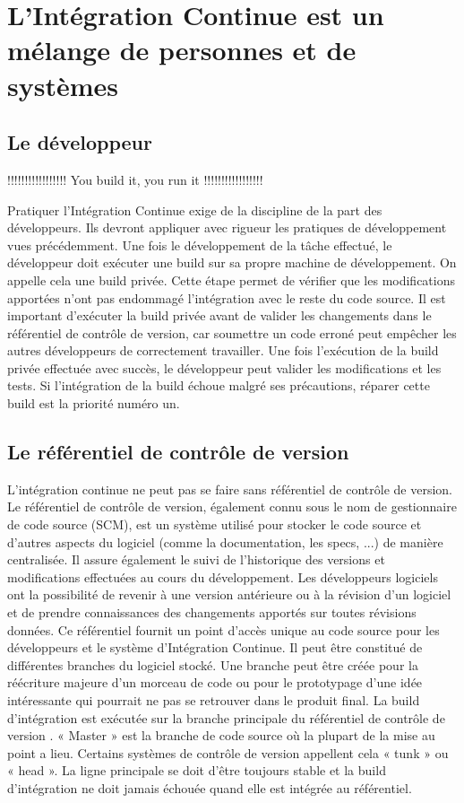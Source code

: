   \section{L’Intégration Continue est un mélange de personnes et de systèmes}

    \subsection{Le développeur}
    !!!!!!!!!!!!!!!!! You build it, you run it !!!!!!!!!!!!!!!!!

    Pratiquer l’Intégration Continue exige de la discipline de la part des développeurs. Ils devront appliquer avec rigueur les pratiques de développement vues précédemment. Une fois le développement de la tâche effectué, le développeur doit exécuter une build sur sa propre machine de développement. On appelle cela une build privée. Cette étape permet de vérifier que les modifications apportées n’ont pas endommagé l'intégration avec le reste du code source. Il est important d'exécuter la build privée avant de valider les changements dans le référentiel de contrôle de version, car soumettre un code erroné peut empêcher les autres développeurs de correctement travailler. Une fois l’exécution de la build privée effectuée avec succès, le développeur peut valider les modifications et les tests. Si l'intégration de la build échoue malgré ses précautions, réparer cette build est la priorité numéro un.

    \subsection{Le référentiel de contrôle de version}\label{SCM}
    L'intégration continue ne peut pas se faire sans référentiel de contrôle de version. Le référentiel de contrôle de version, également connu sous le nom de gestionnaire de code source (SCM), est un système utilisé pour stocker le code source et d'autres aspects du logiciel (comme la documentation, les specs, ...) de manière centralisée. Il assure également le suivi de l'historique des versions et modifications effectuées au cours du développement. Les développeurs logiciels ont la possibilité de revenir à une version antérieure ou à la révision d'un logiciel et de prendre connaissances des changements apportés sur toutes révisions données. Ce référentiel fournit un point d'accès unique au code source pour les développeurs et le système d’Intégration Continue. Il peut être constitué de différentes branches du logiciel stocké. Une branche peut être créée pour la réécriture majeure d’un morceau de code ou pour le prototypage d’une idée intéressante qui pourrait ne pas se retrouver dans le produit final. La build d’intégration est exécutée sur la branche principale du référentiel de contrôle de version \cite{Duv07}. « Master » est la branche de code source où la plupart de la mise au point a lieu. Certains systèmes de contrôle de version appellent cela « tunk » ou « head ». La ligne principale se doit d’être toujours stable et la build d’intégration ne doit jamais échouée quand elle est intégrée au référentiel.

